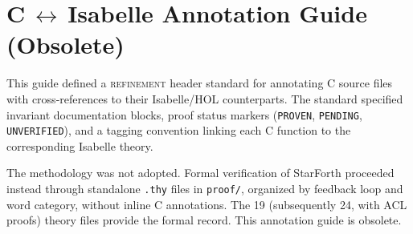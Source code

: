 
\section*{C\,$\leftrightarrow$\,Isabelle Annotation Guide (Obsolete)}

This guide defined a \textsc{refinement} header standard for annotating
C source files with cross-references to their Isabelle/HOL counterparts.
The standard specified invariant documentation blocks, proof status markers
(\texttt{PROVEN}, \texttt{PENDING}, \texttt{UNVERIFIED}), and a tagging
convention linking each C function to the corresponding Isabelle theory.

The methodology was not adopted. Formal verification of StarForth proceeded
instead through standalone \texttt{.thy} files in \texttt{proof/}, organized
by feedback loop and word category, without inline C annotations. The 19
(subsequently 24, with ACL proofs) theory files provide the formal record.
This annotation guide is obsolete.
